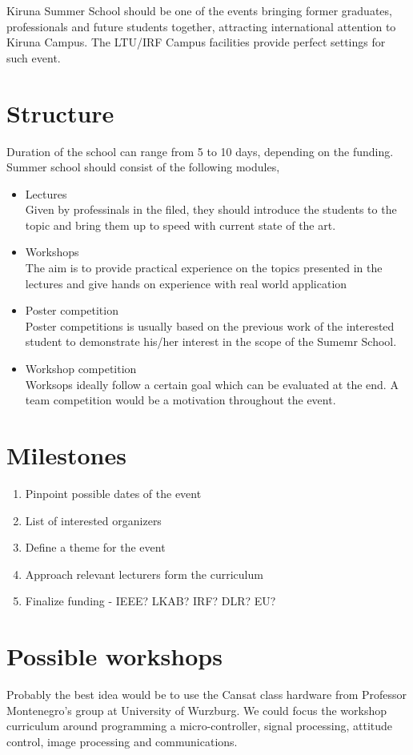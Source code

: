 \documentclass[a4paper,14pt]{article}
\begin{document}
Kiruna Summer School should be one of the events bringing former graduates, professionals and future students together, 
attracting international attention to Kiruna Campus. The LTU/IRF Campus facilities provide perfect settings for such event.

\section{Structure}
Duration of the school can range from 5 to 10 days, depending on the funding. Summer school should consist of the following modules,
\begin{itemize}
\item Lectures \\ Given by professinals in the filed, they should introduce 
the students to the topic and bring them up to speed with current state of the art.
\item Workshops \\ The aim is to provide practical experience on the topics presented in the lectures 
and give hands on experience with real world application
\item Poster competition \\ Poster competitions is usually based on the previous work of the interested student
to demonstrate his/her interest in the scope of the Sumemr School.
\item Workshop competition \\ Worksops ideally follow a certain goal which can be evaluated at the end. 
A team competition would be a motivation throughout the event. 
\end{itemize}

\section{Milestones}
\begin{enumerate}
\item Pinpoint possible dates of the event
\item List of interested organizers
\item Define a theme for the event
\item Approach relevant lecturers form the curriculum
\item Finalize funding - IEEE? LKAB? IRF? DLR? EU? 
\end{enumerate}


\section{Possible workshops}
Probably the best idea would be to use the Cansat class hardware from Professor Montenegro's group
at University of Wurzburg. We could focus the workshop curriculum around programming a micro-controller, 
signal processing, attitude control, image processing and communications. 
\end{document}
